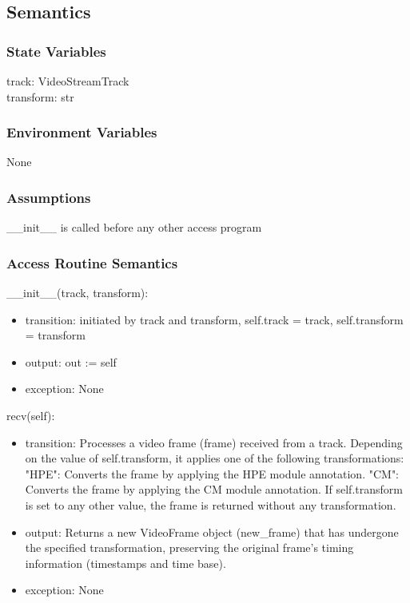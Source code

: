 \documentclass[12pt, titlepage]{article}
\begin{document}
\subsection{Semantics}

\subsubsection{State Variables}
track: VideoStreamTrack\\
transform: str

\subsubsection{Environment Variables}
None

\subsubsection{Assumptions}
\_\_init\_\_ is called before any other access program

\subsubsection{Access Routine Semantics}

\noindent \_\_init\_\_(track, transform):
\begin{itemize}
  \item transition: initiated by track and transform, self.track = track, self.transform = transform
  \item output: out := self
  \item exception: None
\end{itemize}

\noindent recv(self):
\begin{itemize}
  \item transition: Processes a video frame (frame) received from a track. Depending on the value of self.transform, it applies one of the following transformations: "HPE": Converts the frame by applying the HPE module annotation. "CM": Converts the frame by applying the CM module annotation. If self.transform is set to any other value, the frame is returned without any transformation.
  \item output: Returns a new VideoFrame object (new\_frame) that has undergone the specified transformation, preserving the original frame's timing information (timestamps and time base).
  \item exception: None
\end{itemize}
\end{document}
